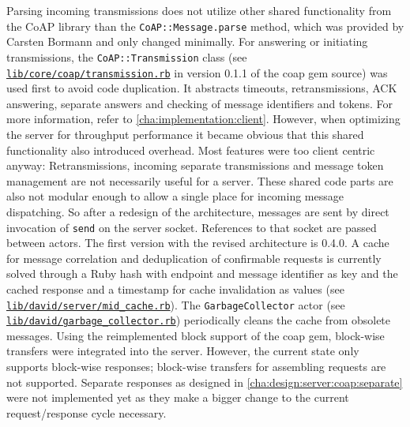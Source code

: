 		Parsing incoming transmissions does not utilize other shared
		functionality from the \ac{CoAP} library than the
		\texttt{CoAP::Message.parse} method, which was provided by Carsten
		Bormann and only changed minimally. For answering or initiating
		transmissions, the \texttt{CoAP::Transmission} class (see
		\href{https://github.com/nning/coap/blob/0.1.1/lib/core/coap/transmission.rb}{\texttt{lib/core/coap/transmission.rb}}
		in version 0.1.1 of the coap gem source) was used first to avoid code
		duplication. It abstracts timeouts, retransmissions, ACK answering,
		separate answers and checking of message identifiers and tokens. For
		more information, refer to \autoref{cha:implementation:client}.
		However, when optimizing the server for throughput performance it
		became obvious that this shared functionality also introduced overhead.
		Most features were too client centric anyway: Retransmissions, incoming
		separate transmissions and message token management are not necessarily
		useful for a server. These shared code parts are also not modular
		enough to allow a single place for incoming message dispatching. So
		after a redesign of the architecture, messages are sent by direct
		invocation of \texttt{send} on the server socket. References to that
		socket are passed between actors. The first version with the revised
		architecture is 0.4.0. A cache for message correlation and
		deduplication of confirmable requests is currently solved through a
		Ruby hash with endpoint and message identifier as key and the cached
		response and a timestamp for cache invalidation as values (see
		\href{https://github.com/nning/david/blob/0.4.3/lib/david/server/mid\_cache.rb}{\texttt{lib/david/server/mid\_cache.rb}}).
		The \texttt{GarbageCollector} actor (see
		\href{https://github.com/nning/david/blob/0.4.3/lib/david/garbage\_collector.rb}{\texttt{lib/david/garbage\_collector.rb}})
		periodically cleans the cache from obsolete messages. Using the
		reimplemented block support of the coap gem, block-wise transfers
		\cite{block} were integrated into the server. However, the current
		state only supports block-wise responses; block-wise transfers for
		assembling requests are not supported. Separate responses as designed
		in \autoref{cha:design:server:coap:separate} were not implemented yet
		as they make a bigger change to the current request/response cycle
		necessary.
		
